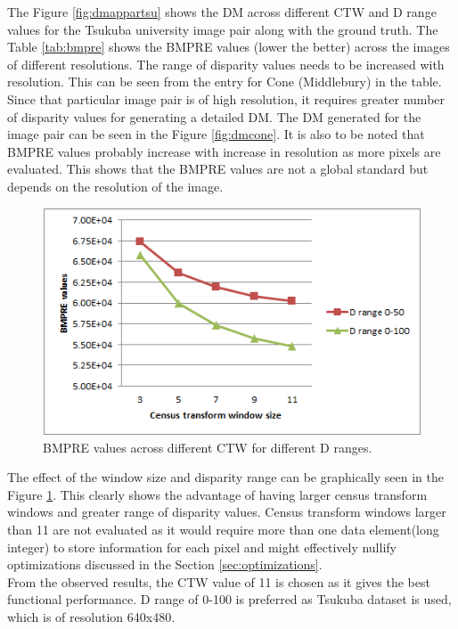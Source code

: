 The Figure \ref{fig:dmappartsu} shows the DM across different CTW and D range values for the Tsukuba university image pair along with the ground truth. The Table \ref{tab:bmpre} shows the BMPRE values (lower the better) across the images of different resolutions. The range of disparity values needs to be increased with resolution. This can be seen from the entry for Cone (Middlebury) in the table. Since that particular image pair is of high resolution, it requires greater number of disparity values for generating a detailed DM. The DM generated for the image pair can be seen in the Figure \ref{fig:dmcone}. It is also to be noted that BMPRE values probably increase with increase in resolution as more pixels are evaluated. This shows that the BMPRE values are not a global standard but depends on the resolution of the image.

\begin{figure}
  \center
  \captionsetup{justification=centering}
  \includegraphics[width=.8\linewidth]{figures/BMPRE}
  \caption{BMPRE values across different CTW for different D ranges.}
  \label{fig:bmpre}
\end{figure}

 The effect of the window size and disparity range can be graphically seen in the Figure \ref{fig:bmpre}. This clearly shows the advantage of having larger census transform windows and greater range of disparity values. Census transform windows larger than 11 are not evaluated as it would require more than one data element(long integer) to store information for each pixel and might effectively nullify optimizations discussed in the Section \ref{sec:optimizations}.
 \\
From the observed results, the CTW value of 11 is chosen as it gives the best functional performance. D range of 0-100 is preferred as Tsukuba dataset is used, which is of resolution 640x480.


